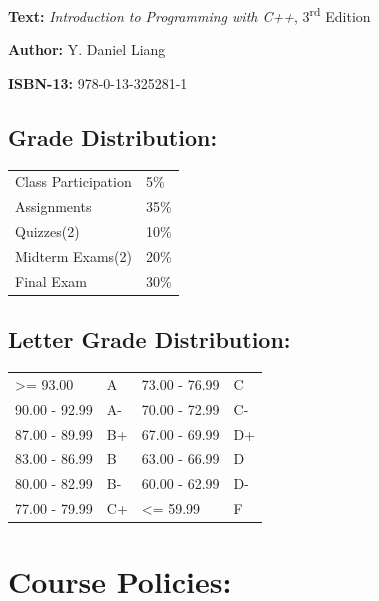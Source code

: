 \documentclass[11pt]{article}
\newcommand{\tf}[1]{%
  \large\textbf{#1}
}
\begin{document}
\tf{Text:} \emph{Introduction to Programming with C++}, 3\textsuperscript{rd} Edition

\tf{Author:} Y. Daniel Liang

\tf{ISBN-13:} 978-0-13-325281-1

\subsection*{Grade Distribution:}
\label{sec:grades}

\begin{center}
  \begin{tabular}{ l l }
    Class Participation & 5\% \\
    Assignments & 35\% \\
    Quizzes(2)  & 10\% \\
    Midterm Exams(2)  & 20\% \\
    Final Exam  & 30\%
  \end{tabular}
\end{center}

\subsection*{Letter Grade Distribution:}
\label{sec:lettergrades}

\begin{center}
  \begin{tabular}{ l l | l l }
    \textgreater= 93.00 & A & 73.00 - 76.99 & C \\
    90.00 - 92.99 & A-  & 70.00 - 72.99 & C- \\
    87.00 - 89.99 & B+  & 67.00 - 69.99 & D+ \\
    83.00 - 86.99 & B  & 63.00 - 66.99 & D \\
    80.00 - 82.99 & B-  & 60.00 - 62.99 & D- \\
    77.00 - 79.99 & C+  & \textless= 59.99 & F \\
  \end{tabular}  
\end{center}

\section*{Course Policies:}
\label{sec:policies}
\end{document}
